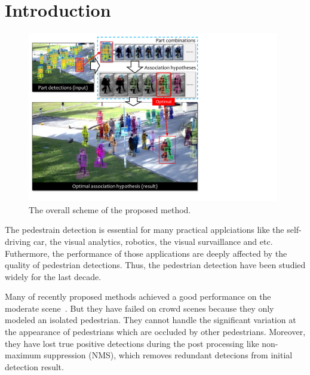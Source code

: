 \documentclass[runningheads]{llncs}
\begin{document}
\section{Introduction}
\label{sec:introduction}

\begin{figure}[t]
   \includegraphics[width=0.98\textwidth]{../figures/teasure.pdf}
   \caption{The overall scheme of the proposed method.}
   \label{fig:overall_scheme}
\end{figure}

The pedestrain detection is essential for many practical applciations like the self-driving car, the visual analytics, robotics, the visual survaillance and etc.
Futhermore, the performance of those applications are deeply affected by the quality of pedestrian detections.
Thus, the pedestrian detection have been studied widely for the last decade.

Many of recently proposed methods achieved a good performance on the moderate scene~\cite{dalal2005histograms, felzenszwalb2010object, dollar2009integral, DollarECCV2012crosstalkCascades}.
But they have failed on crowd scenes because they only modeled an isolated pedestrian.
They cannot handle the significant variation at the appearance of pedestrians which are occluded by other pedestrians.
Moreover, they have lost true positive detections during the post processing like non-maximum suppression (NMS), which removes redundant detecions from initial detection result.
\end{document}
